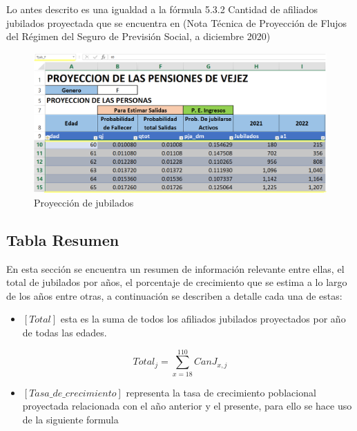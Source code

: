 \documentclass[
  letterpaper,
  DIV=11,
  numbers=noendperiod]{scrreprt}
\providecommand{\tightlist}{%
  \setlength{\itemsep}{0pt}\setlength{\parskip}{0pt}}\usepackage{longtable,booktabs,array}
\begin{document}
Lo antes descrito es una igualdad a la fórmula 5.3.2 Cantidad de
afiliados jubilados proyectada que se encuentra en (Nota Técnica de
Proyección de Flujos del Régimen del Seguro de Previsión Social, a
diciembre 2020)

\begin{figure}

{\centering \includegraphics{images/F/Img26.png}

}

\caption{Proyección de jubilados}

\end{figure}

\hypertarget{tabla-resumen-1}{%
\subsection{Tabla Resumen}\label{tabla-resumen-1}}

En esta sección se encuentra un resumen de información relevante entre
ellas, el total de jubilados por años, el porcentaje de crecimiento que
se estima a lo largo de los años entre otras, a continuación se
describen a detalle cada una de estas:

\begin{itemize}
\tightlist
\item
  \([Total]\) esta es la suma de todos los afiliados jubilados
  proyectados por año de todas las edades.
\end{itemize}

\begin{equation}
Total_j=\sum_{x=18}^{110}{C{anJ}_{x,j}}
\end{equation}

\begin{itemize}
\tightlist
\item
  \([Tasa\_de\_crecimiento]\) representa la tasa de crecimiento
  poblacional proyectada relacionada con el año anterior y el presente,
  para ello se hace uso de la siguiente formula
\end{itemize}
\end{document}
